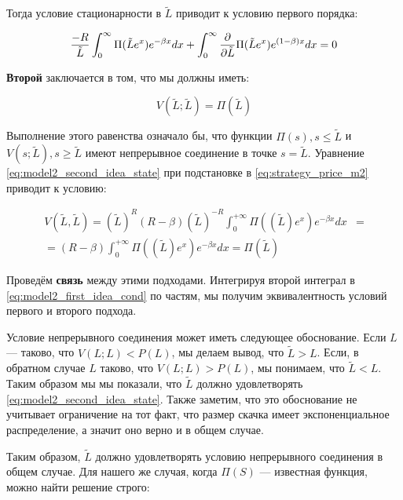 \documentclass[a4paper,12pt]{article}
\theoremstyle{definition}
\begin{document}
Тогда условие стационарности в $\tilde{L}$ приводит к условию первого порядка:

\begin{equation}\label{eq:model2_first_idea_cond}
    \frac{-R}{\tilde{L}} \int_{0}^{\infty} \Pi(\tilde{L} e^{x}) e^{-\beta x} dx + \int_{0}^{\infty} \pdv{}{\tilde{L}} \Pi(\tilde{L} e^{x}) e^{(1 - \beta) x} dx = 0
\end{equation}

\textbf{Второй} заключается в том, что мы должны иметь:

\begin{equation}\label{eq:model2_second_idea_state}
    V(\tilde{L}; \tilde{L}) = \Pi(\tilde{L})
\end{equation}

Выполнение этого равенства означало бы, что функции $\Pi(s), s \le \tilde{L}$ и $V(s; \tilde{L}), s \ge \tilde{L}$ имеют непрерывное соединение в точке $s = \tilde{L}$. Уравнение \eqref{eq:model2_second_idea_state} при подстановке в \eqref{eq:strategy_price_m2} приводит к условию:

\begin{equation}\label{eq:model2_second_idea_cond}
\begin{split}
    V(\tilde{L}, \tilde{L}) = (\tilde{L})^R (R - \beta) (\tilde{L})^{-R} \int_{0}^{+\infty} \Pi((\tilde{L}) e^x) e^{-\beta x} dx &=\\
    = (R - \beta) \int_{0}^{+\infty} \Pi((\tilde{L}) e^x) e^{-\beta x} dx = \Pi(\tilde{L})
\end{split}
\end{equation}

Проведём \textbf{связь} между этими подходами. Интегрируя второй интеграл в \eqref{eq:model2_first_idea_cond} по частям, мы получим эквивалентность условий первого и второго подхода.

Условие непрерывного соединения может иметь следующее обоснование. Если $L$ --- таково, что $V(L; L) < P(L)$, мы делаем вывод, что $\tilde{L} > L$. Если, в обратном случае $L$ таково, что $V(L; L) > P(L)$, мы понимаем, что $\tilde{L} < L$. Таким образом мы мы показали, что $\tilde{L}$ должно удовлетворять \eqref{eq:model2_second_idea_state}. Также заметим, что это обоснование не учитывает ограничение на тот факт, что размер скачка имеет экспоненциальное распределение, а значит оно верно и в общем случае.

Таким образом, $\tilde{L}$ должно удовлетворять условию непрерывного соединения в общем случае. Для нашего же случая, когда $\Pi(S)$ --- известная функция, можно найти решение строго:
\end{document}
